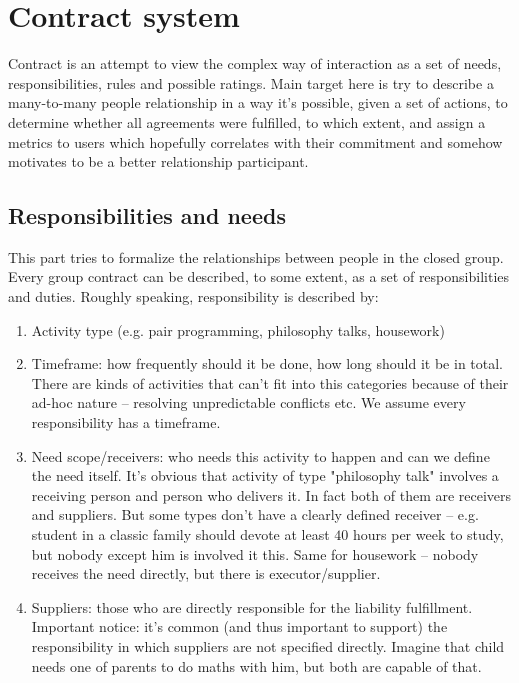 \documentclass[]{itmo-student-thesis}
\begin{document}
\section{Contract system}

Contract is an attempt to view the complex way of interaction as a set
of needs, responsibilities, rules and possible ratings. Main target
here is try to describe a many-to-many people relationship in a way
it’s possible, given a set of actions, to determine whether all
agreements were fulfilled, to which extent, and assign a metrics to
users which hopefully correlates with their commitment and somehow
motivates to be a better relationship participant.

\subsection{Responsibilities and needs}

This part tries to formalize the relationships between people in the
closed group. Every group contract can be described, to some extent,
as a set of responsibilities and duties. Roughly speaking,
responsibility is described by:

\begin{enumerate}

\item Activity type (e.g. pair programming, philosophy talks,
  housework)

\item Timeframe: how frequently should it be done, how long should it
  be in total. There are kinds of activities that can’t fit into this
  categories because of their ad-hoc nature -- resolving unpredictable
  conflicts etc. We assume every responsibility has a timeframe.

\item Need scope/receivers: who needs this activity to happen and can
  we define the need itself. It’s obvious that activity of type
  "philosophy talk" involves a receiving person and person who
  delivers it. In fact both of them are receivers and suppliers. But
  some types don’t have a clearly defined receiver -- e.g. student in
  a classic family should devote at least $40$ hours per week to
  study, but nobody except him is involved it this. Same for housework
  -- nobody receives the need directly, but there is
  executor/supplier.

\item Suppliers: those who are directly responsible for the liability
  fulfillment. Important notice: it’s common (and thus important to
  support) the responsibility in which suppliers are not specified
  directly. Imagine that child needs one of parents to do maths with
  him, but both are capable of that.

\end{enumerate}
\end{document}
